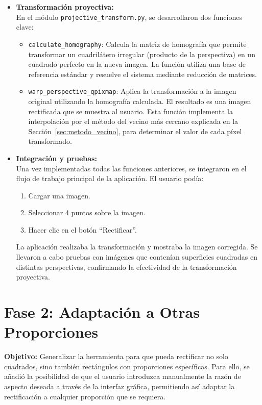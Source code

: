 \begin{itemize}
    \item \textbf{Transformación proyectiva:} \\
    En el módulo \texttt{projective\_transform.py}, se desarrollaron dos funciones clave:
    \begin{itemize}
        \item \texttt{calculate\_homography}: Calcula la matriz de homografía que permite transformar un cuadrilátero irregular (producto de la perspectiva) en un cuadrado perfecto en la nueva imagen. La función utiliza una base de referencia estándar y resuelve el sistema mediante reducción de matrices.
        \item \texttt{warp\_perspective\_qpixmap}: Aplica la transformación a la imagen original utilizando la homografía calculada. El resultado es una imagen rectificada que se muestra al usuario. Esta función implementa la interpolación por el método del vecino más cercano explicada en la Sección~\ref{sec:metodo_vecino}, para determinar el valor de cada píxel transformado.
    \end{itemize}
    
    \item \textbf{Integración y pruebas:} \\
    Una vez implementadas todas las funciones anteriores, se integraron en el flujo de trabajo principal de la aplicación. El usuario podía:
    \begin{enumerate}
        \item Cargar una imagen.
        \item Seleccionar 4 puntos sobre la imagen.
        \item Hacer clic en el botón “Rectificar”.
    \end{enumerate}
    La aplicación realizaba la transformación y mostraba la imagen corregida. Se llevaron a cabo pruebas con imágenes que contenían superficies cuadradas en distintas perspectivas, confirmando la efectividad de la transformación proyectiva.
\end{itemize}

\section{Fase 2: Adaptación a Otras Proporciones}

\textbf{Objetivo:} Generalizar la herramienta para que pueda rectificar no solo cuadrados, sino también rectángulos con proporciones específicas. Para ello, se añadió la posibilidad de que el usuario introduzca manualmente la razón de aspecto deseada a través de la interfaz gráfica, permitiendo así adaptar la rectificación a cualquier proporción que se requiera.

